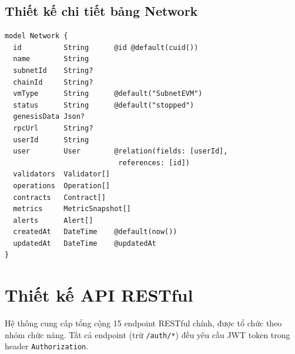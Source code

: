 \subsection{Thiết kế chi tiết bảng Network}

\begin{lstlisting}[caption={Prisma Schema --- Model Network}, label={lst:prisma_network}, language={}]
model Network {
  id          String      @id @default(cuid())
  name        String
  subnetId    String?
  chainId     String?
  vmType      String      @default("SubnetEVM")
  status      String      @default("stopped")
  genesisData Json?
  rpcUrl      String?
  userId      String
  user        User        @relation(fields: [userId],
                           references: [id])
  validators  Validator[]
  operations  Operation[]
  contracts   Contract[]
  metrics     MetricSnapshot[]
  alerts      Alert[]
  createdAt   DateTime    @default(now())
  updatedAt   DateTime    @updatedAt
}
\end{lstlisting}


\section{Thiết kế API RESTful}

Hệ thống cung cấp tổng cộng 15 endpoint RESTful chính, được tổ chức theo nhóm chức năng. Tất cả endpoint (trừ \texttt{/auth/*}) đều yêu cầu JWT token trong header \texttt{Authorization}.

